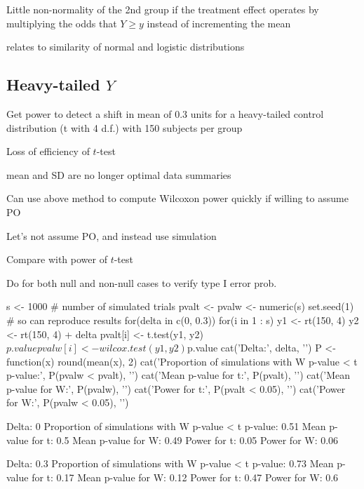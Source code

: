 \item Little non-normality of the 2nd group if the treatment effect operates by multiplying the odds that $Y \geq y$ instead of incrementing the mean
 \bi
 \item relates to similarity of normal and logistic distributions
 \ei
\ei

\subsection{Heavy-tailed $Y$}
\bi
\item Get power to detect a shift in mean of 0.3 units for a heavy-tailed control distribution (t with 4 d.f.) with 150 subjects per group
\item Loss of efficiency of $t$-test
 \bi
 \item mean and SD are no longer optimal data summaries
 \ei
\item Can use above method to compute Wilcoxon power quickly if willing to assume PO
\item Let's not assume PO, and instead use simulation
\item Compare with power of $t$-test
\item Do for both null and non-null cases to verify type I error prob.

\begin{Schunk}
\begin{Sinput}
s <- 1000    # number of simulated trials
pvalt <- pvalw <- numeric(s)
set.seed(1)  # so can reproduce results
for(delta in c(0, 0.3)) {
  for(i in 1 : s) {
    y1 <- rt(150, 4)
    y2 <- rt(150, 4) + delta
    pvalt[i] <- t.test(y1, y2)$p.value
    pvalw[i] <- wilcox.test(y1, y2)$p.value
  }
  cat('Delta:', delta, '\n')
  P <- function(x) round(mean(x), 2)
  cat('Proportion of simulations with W p-value < t p-value:',
      P(pvalw < pvalt), '\n')
  cat('Mean p-value for t:', P(pvalt), '\n')
  cat('Mean p-value for W:', P(pvalw), '\n')
  cat('Power for t:', P(pvalt < 0.05), '\n')
  cat('Power for W:', P(pvalw < 0.05), '\n\n')
}
\end{Sinput}
\begin{Soutput}
Delta: 0 
Proportion of simulations with W p-value < t p-value: 0.51 
Mean p-value for t: 0.5 
Mean p-value for W: 0.49 
Power for t: 0.05 
Power for W: 0.06 

Delta: 0.3 
Proportion of simulations with W p-value < t p-value: 0.73 
Mean p-value for t: 0.17 
Mean p-value for W: 0.12 
Power for t: 0.47 
Power for W: 0.6 
\end{Soutput}
\end{Schunk}

